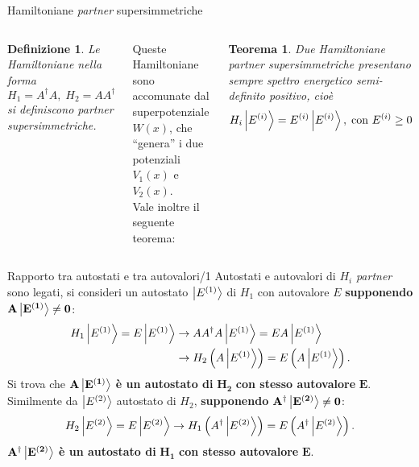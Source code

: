 \documentclass[11pt,aspectratio=169,handout]{beamer}
\newtheorem{teo}[theorem]{Teorema}
\newtheorem{de}[theorem]{Definizione}
\begin{document}
\begin{frame}{Hamiltoniane \textit{partner} supersimmetriche}
    \begin{columns}
        \begin{de}
            Le Hamiltoniane nella forma
            $$H_1 = A^\dagger A,\; H_2 = AA^\dagger$$
            si definiscono \textit{partner supersimmetriche}.
        \end{de}
        Queste Hamiltoniane sono accomunate dal superpotenziale $W(x)$,
        che ``genera'' i due potenziali $V_1(x)$ e $V_2(x)$.
        \phantom{miao}\\
        Vale inoltre il seguente teorema:
        \begin{teo}
            Due Hamiltoniane partner supersimmetriche presentano sempre spettro energetico
            semi-definito positivo, cioè
            $$H_i\ket{E^{(i)}} = E^{(i)}\ket{E^{(i)}},\;\text{con }E^{(i)}\geq0$$
        \end{teo} 
    \end{columns}
\end{frame}
\begin{frame}{Rapporto tra autostati e tra autovalori/1}
    Autostati e autovalori di $H_i$ \textit{partner} sono legati,
    si consideri un autostato $\ket{E^{(1)}}$ di $H_1$ con
    autovalore $E$ \textbf{supponendo} $\mathbf{A\ket{E^{(1)}}\neq0}$:
    \begin{align*}
        H_1\ket{E^{(1)}}=E\ket{E^{(1)}}&\to
        AA^\dagger A \ket{E^{(1)}} = EA\ket{E^{(1)}}\\
                                       &\to H_2\left(A\ket{E^{(1)}}\right) = E\left(A\ket{E^{(1)}}\right).
    \end{align*}
    Si trova che $\mathbf{A\ket{E^{(1)}}}$ \textbf{è un autostato di}
    $\mathbf{H_2}$ \textbf{con stesso autovalore}
    $\mathbf{E}$.\\
    Similmente da $\ket{E^{(2)}}$ autostato di $H_2$, \textbf{supponendo} 
    $\mathbf{A^\dagger\ket{E^{(2)}}\neq0}$:
    \begin{equation*}
        H_2\ket{E^{(2)}}=E\ket{E^{(2)}}\to H_1\left(A^\dagger\ket{E^{(2)}}\right)=
        E\left(A^\dagger\ket{E^{(2)}}\right).
    \end{equation*}
    $\mathbf{A^\dagger\ket{E^{(2)}}}$ \textbf{è un autostato di}
    $\mathbf{H_1}$ \textbf{con stesso autovalore} $\mathbf{E}$.

\end{frame}
\end{document}
